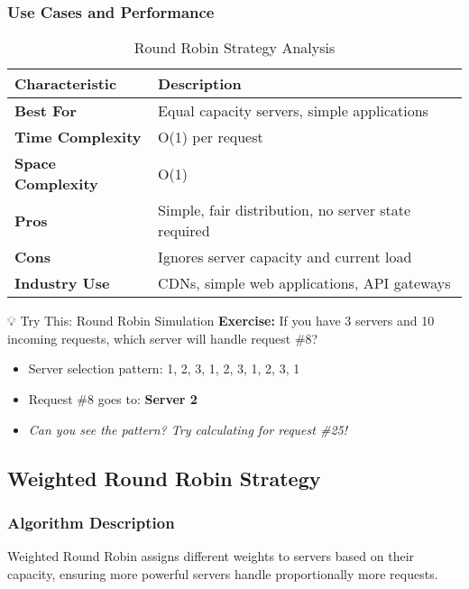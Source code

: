 \documentclass[12pt,a4paper]{article}
\begin{document}
\subsubsection{Use Cases and Performance}
\begin{table}[H]
\centering
\begin{tabular}{@{}lp{8cm}@{}}
\toprule
\textbf{Characteristic} & \textbf{Description} \\
\midrule
\textbf{Best For} & Equal capacity servers, simple applications \\
\textbf{Time Complexity} & O(1) per request \\
\textbf{Space Complexity} & O(1) \\
\textbf{Pros} & Simple, fair distribution, no server state required \\
\textbf{Cons} & Ignores server capacity and current load \\
\textbf{Industry Use} & CDNs, simple web applications, API gateways \\
\bottomrule
\end{tabular}
\caption{Round Robin Strategy Analysis}
\label{tab:roundrobin}
\end{table}

\begin{exercisebox}{💡 Try This: Round Robin Simulation}
\textbf{Exercise:} If you have 3 servers and 10 incoming requests, which server will handle request \#8?
\begin{itemize}
    \item Server selection pattern: 1, 2, 3, 1, 2, 3, 1, 2, 3, 1
    \item Request \#8 goes to: \textbf{Server 2}
    \item \textit{Can you see the pattern? Try calculating for request \#25!}
\end{itemize}
\end{exercisebox}

\subsection{Weighted Round Robin Strategy}
\label{subsec:weighted}

\subsubsection{Algorithm Description}
Weighted Round Robin assigns different weights to servers based on their capacity, ensuring more powerful servers handle proportionally more requests.
\end{document}
